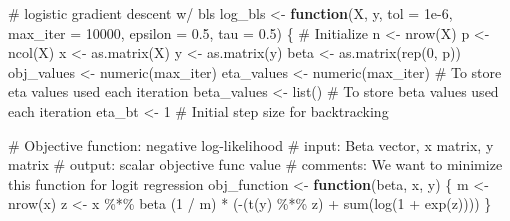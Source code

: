 \documentclass[
  letterpaper,
  DIV=11,
  numbers=noendperiod]{scrartcl}
\newenvironment{Shaded}{\begin{snugshade}}{\end{snugshade}}
\newcommand{\AttributeTok}[1]{\textcolor[rgb]{0.40,0.45,0.13}{#1}}
\newcommand{\CommentTok}[1]{\textcolor[rgb]{0.37,0.37,0.37}{#1}}
\newcommand{\ControlFlowTok}[1]{\textcolor[rgb]{0.00,0.23,0.31}{\textbf{#1}}}
\newcommand{\DecValTok}[1]{\textcolor[rgb]{0.68,0.00,0.00}{#1}}
\newcommand{\FloatTok}[1]{\textcolor[rgb]{0.68,0.00,0.00}{#1}}
\newcommand{\FunctionTok}[1]{\textcolor[rgb]{0.28,0.35,0.67}{#1}}
\newcommand{\NormalTok}[1]{\textcolor[rgb]{0.00,0.23,0.31}{#1}}
\newcommand{\OtherTok}[1]{\textcolor[rgb]{0.00,0.23,0.31}{#1}}
\newcommand{\SpecialCharTok}[1]{\textcolor[rgb]{0.37,0.37,0.37}{#1}}
\begin{document}
\begin{Shaded}
\begin{Highlighting}[]
\CommentTok{\# logistic gradient descent w/ bls}
\NormalTok{log\_bls }\OtherTok{\textless{}{-}} \ControlFlowTok{function}\NormalTok{(X, y, }\AttributeTok{tol =} \FloatTok{1e{-}6}\NormalTok{, }\AttributeTok{max\_iter =} \DecValTok{10000}\NormalTok{, }\AttributeTok{epsilon =} \FloatTok{0.5}\NormalTok{, }\AttributeTok{tau =} \FloatTok{0.5}\NormalTok{) \{}
  \CommentTok{\# Initialize}
\NormalTok{  n }\OtherTok{\textless{}{-}} \FunctionTok{nrow}\NormalTok{(X)}
\NormalTok{  p }\OtherTok{\textless{}{-}} \FunctionTok{ncol}\NormalTok{(X)}
\NormalTok{  x }\OtherTok{\textless{}{-}} \FunctionTok{as.matrix}\NormalTok{(X)}
\NormalTok{  y }\OtherTok{\textless{}{-}} \FunctionTok{as.matrix}\NormalTok{(y)}
\NormalTok{  beta }\OtherTok{\textless{}{-}} \FunctionTok{as.matrix}\NormalTok{(}\FunctionTok{rep}\NormalTok{(}\DecValTok{0}\NormalTok{, p))}
\NormalTok{  obj\_values }\OtherTok{\textless{}{-}} \FunctionTok{numeric}\NormalTok{(max\_iter)}
\NormalTok{  eta\_values }\OtherTok{\textless{}{-}} \FunctionTok{numeric}\NormalTok{(max\_iter)  }\CommentTok{\# To store eta values used each iteration}
\NormalTok{  beta\_values }\OtherTok{\textless{}{-}} \FunctionTok{list}\NormalTok{() }\CommentTok{\# To store beta values used each iteration}
\NormalTok{  eta\_bt }\OtherTok{\textless{}{-}} \DecValTok{1}  \CommentTok{\# Initial step size for backtracking}
  
  \CommentTok{\# Objective function: negative log{-}likelihood}
  \CommentTok{\# input: Beta vector, x matrix, y matrix}
  \CommentTok{\# output: scalar objective func value}
  \CommentTok{\# comments: We want to minimize this function for logit regression}
\NormalTok{  obj\_function }\OtherTok{\textless{}{-}} \ControlFlowTok{function}\NormalTok{(beta, x, y) \{}
\NormalTok{    m }\OtherTok{\textless{}{-}} \FunctionTok{nrow}\NormalTok{(x)}
\NormalTok{    z }\OtherTok{\textless{}{-}}\NormalTok{ x }\SpecialCharTok{\%*\%}\NormalTok{ beta}
\NormalTok{    (}\DecValTok{1} \SpecialCharTok{/}\NormalTok{ m) }\SpecialCharTok{*}\NormalTok{ (}\SpecialCharTok{{-}}\NormalTok{(}\FunctionTok{t}\NormalTok{(y) }\SpecialCharTok{\%*\%}\NormalTok{ z) }\SpecialCharTok{+} \FunctionTok{sum}\NormalTok{(}\FunctionTok{log}\NormalTok{(}\DecValTok{1} \SpecialCharTok{+} \FunctionTok{exp}\NormalTok{(z))))}
\NormalTok{  \}}
  

\end{Highlighting}
\end{Shaded}
\end{document}
